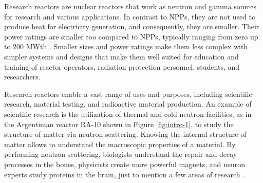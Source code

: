\label{ch:intro}


Research reactors are nuclear reactors that work as neutron and gamma sources for research and various applications.
In contrast to \glspl*{NPP}, they are not used to produce heat for electricity generation, and consequently, they are smaller.
Their power ratings are smaller too compared to \glspl*{NPP}, typically ranging from zero up to 200 MWth \cite{iaea-research}.
Smaller sizes and power ratings make them less complex with simpler systems and designs that make them well suited for education and training of reactor operators, radiation protection personnel, students, and researchers.

Research reactors enable a vast range of uses and purposes, including scientific research, material testing, and radioactive material production.
An example of scientific research is the utilization of thermal and cold neutron facilities, as in the Argentinian reactor RA-10 shown in Figure \ref{fig:intro-1}, to study the structure of matter via neutron scattering.
Knowing the internal structure of matter allows to understand the macroscopic properties of a material.
By performing neutron scattering, biologists understand the repair and decay processes in the bones, physicists create more powerful magnets, and neuron experts study proteins in the brain, just to mention a few areas of research \cite{iaea-research}.

